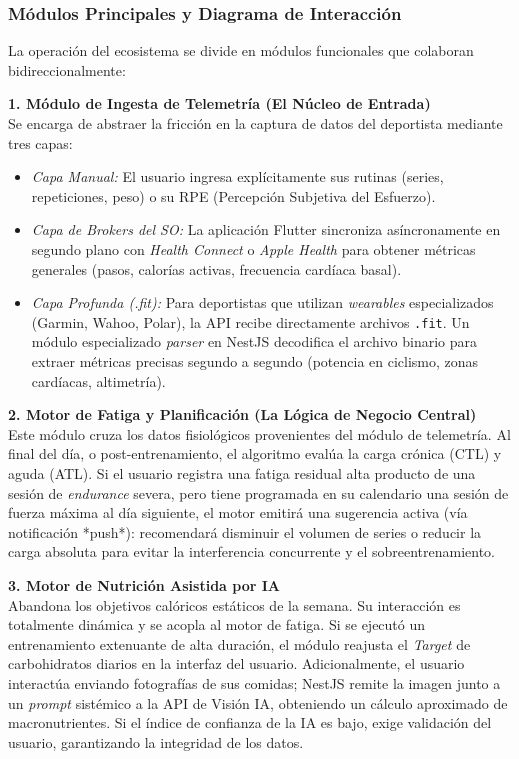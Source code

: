 \documentclass[12pt]{article}
\begin{document}
\subsubsection{Módulos Principales y Diagrama de Interacción}
La operación del ecosistema se divide en módulos funcionales que colaboran bidireccionalmente:

\textbf{1. Módulo de Ingesta de Telemetría (El Núcleo de Entrada)}\\
Se encarga de abstraer la fricción en la captura de datos del deportista mediante tres capas:
\begin{itemize}
    \item \textit{Capa Manual:} El usuario ingresa explícitamente sus rutinas (series, repeticiones, peso) o su RPE (Percepción Subjetiva del Esfuerzo).
    \item \textit{Capa de Brokers del SO:} La aplicación Flutter sincroniza asíncronamente en segundo plano con \textit{Health Connect} o \textit{Apple Health} para obtener métricas generales (pasos, calorías activas, frecuencia cardíaca basal).
    \item \textit{Capa Profunda (.fit):} Para deportistas que utilizan \textit{wearables} especializados (Garmin, Wahoo, Polar), la API recibe directamente archivos \texttt{.fit}. Un módulo especializado \textit{parser} en NestJS decodifica el archivo binario para extraer métricas precisas segundo a segundo (potencia en ciclismo, zonas cardíacas, altimetría).
\end{itemize}

\textbf{2. Motor de Fatiga y Planificación (La Lógica de Negocio Central)}\\
Este módulo cruza los datos fisiológicos provenientes del módulo de telemetría. Al final del día, o post-entrenamiento, el algoritmo evalúa la carga crónica (CTL) y aguda (ATL). Si el usuario registra una fatiga residual alta producto de una sesión de \textit{endurance} severa, pero tiene programada en su calendario una sesión de fuerza máxima al día siguiente, el motor emitirá una sugerencia activa (vía notificación *push*): recomendará disminuir el volumen de series o reducir la carga absoluta para evitar la interferencia concurrente y el sobreentrenamiento.

\textbf{3. Motor de Nutrición Asistida por IA}\\
Abandona los objetivos calóricos estáticos de la semana. Su interacción es totalmente dinámica y se acopla al motor de fatiga. Si se ejecutó un entrenamiento extenuante de alta duración, el módulo reajusta el \textit{Target} de carbohidratos diarios en la interfaz del usuario. Adicionalmente, el usuario interactúa enviando fotografías de sus comidas; NestJS remite la imagen junto a un \textit{prompt} sistémico a la API de Visión IA, obteniendo un cálculo aproximado de macronutrientes. Si el índice de confianza de la IA es bajo, exige validación del usuario, garantizando la integridad de los datos.
\end{document}

